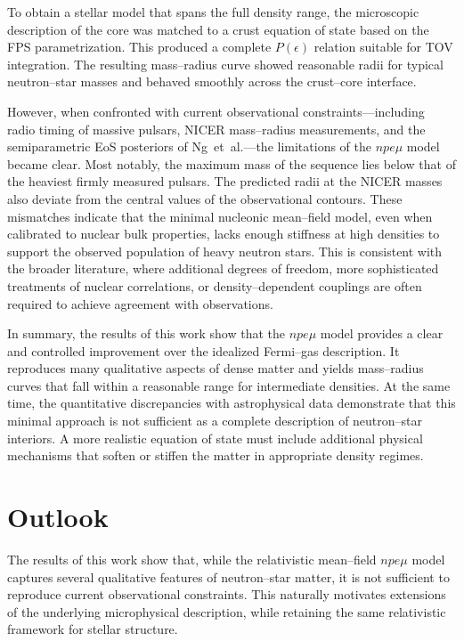 To obtain a stellar model that spans the full density range, the microscopic
description of the core was matched to a crust equation of state based on the FPS
parametrization. This produced a complete $P(\epsilon)$ relation suitable
for TOV integration. The resulting mass–radius curve showed reasonable radii
for typical neutron–star masses and behaved smoothly across the crust–core
interface.

However, when confronted with current observational constraints—including radio
timing of massive pulsars, NICER mass–radius measurements, and the
semiparametric EoS posteriors of Ng~et~al.—the limitations of the $npe\mu$
model became clear. Most notably, the maximum mass of the sequence lies below
that of the heaviest firmly measured pulsars. The predicted radii at the NICER
masses also deviate from the central values of the observational contours.
These mismatches indicate that the minimal nucleonic mean–field model, even
when calibrated to nuclear bulk properties, lacks enough stiffness at high
densities to support the observed population of heavy neutron stars. This is
consistent with the broader literature, where additional degrees of freedom,
more sophisticated treatments of nuclear correlations, or density–dependent
couplings are often required to achieve agreement with observations.

In summary, the results of this work show that the $npe\mu$ model provides a
clear and controlled improvement over the idealized Fermi–gas description. It
reproduces many qualitative aspects of dense matter and yields mass–radius
curves that fall within a reasonable range for intermediate densities. At the
same time, the quantitative discrepancies with astrophysical data demonstrate
that this minimal approach is not sufficient as a complete description of
neutron–star interiors. A more realistic equation of state must include
additional physical mechanisms that soften or stiffen the matter in appropriate
density regimes.

\section*{Outlook}

The results of this work show that, while the relativistic mean--field
$npe\mu$ model captures several qualitative features of neutron--star matter,
it is not sufficient to reproduce current observational constraints. This
naturally motivates extensions of the underlying microphysical description,
while retaining the same relativistic framework for stellar structure.

